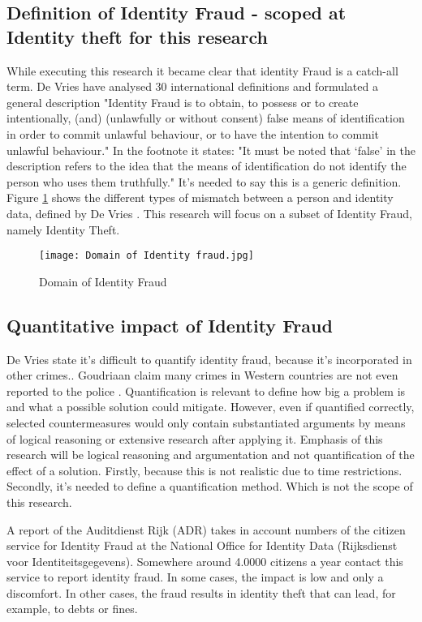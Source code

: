 \subsection{Definition of Identity Fraud - scoped at Identity theft for this research}
While executing this research it became clear that identity Fraud is a catch-all term. De Vries \etal \cite{97408536fd1c4f4e9d1615b7a4a4473e} have analysed 30 international definitions and formulated a general description "Identity Fraud is to obtain, to possess or to create intentionally, (and) (unlawfully or without consent) false means of identification
in order to commit unlawful behaviour, or to have the intention to commit unlawful behaviour." In the footnote it states: "It must be noted that ‘false’ in the description refers to the idea that the means of identification do not identify the person who uses them truthfully." It's needed to say this is a generic definition. Figure \ref{fig:ID_fraud} shows the different types of mismatch between a person and identity data, defined by De Vries \etal \cite{Vries2007IdentiteitsfraudeEA}. This research will focus on a subset of Identity Fraud, namely Identity Theft.
\graphicspath{ {./images/} }
\begin{figure}[t]
\texttt{[image: Domain of Identity fraud.jpg]}\\
\caption{Domain of Identity Fraud}
\label{fig:ID_fraud}
\end{figure}

\subsection{Quantitative impact of Identity Fraud}
De Vries \etal state it's difficult to quantify identity fraud, because it's incorporated in other crimes.\cite{Vries2007IdentiteitsfraudeEA}. Goudriaan \etal claim many crimes in Western countries are not even reported to the police \cite{Gourdriaan_etal}. Quantification is relevant to define how big a problem is and what a possible solution could mitigate. However, even if quantified correctly, selected countermeasures would only contain substantiated arguments by means of logical reasoning or extensive research after applying it. Emphasis of this research will be logical reasoning and argumentation and not quantification of the effect of a solution. Firstly, because this is not realistic due to time restrictions. Secondly, it's needed to define a quantification method. Which is not the scope of this research.

A report of the Auditdienst Rijk (ADR)\cite{ADR} takes in account numbers of the citizen service for Identity Fraud at the National Office for Identity Data (Rijksdienst voor Identiteitsgegevens). Somewhere around 4.0000 citizens a year contact this service to report identity fraud. In some cases, the impact is low and only a discomfort. In other cases, the fraud results in identity theft that can lead, for example, to debts or fines.\par


